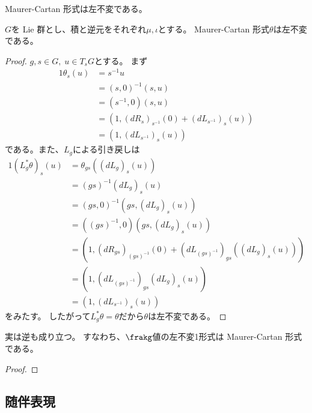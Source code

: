 \documentclass[report]{jlreq}
\begin{document}
Maurer-Cartan 形式は左不変である。

\begin{proposition}
    $G$を Lie 群とし、積と逆元をそれぞれ$\mu, \iota$とする。
    Maurer-Cartan 形式$\theta$は左不変である。
\end{proposition}

\begin{proof}
    $g, s \in G,\; u \in T_sG$とする。
    まず
    \begin{alignat}{1}
        \theta_s(u)
            &= s^{-1}u \\
            &= (s, 0)^{-1} (s, u) \\
            &= (s^{-1}, 0) (s, u) \\
            &= (1, (dR_s)_{s^{-1}}(0) + (dL_{s^{-1}})_s(u)) \\
            &= (1, (dL_{s^{-1}})_s(u))
    \end{alignat}
    である。また、$L_g$による引き戻しは
    \begin{alignat}{1}
        (L_g^* \theta)_s (u)
            &= \theta_{gs} ((dL_g)_s(u)) \\
            &= (gs)^{-1} (dL_g)_s(u) \\
            &= (gs, 0)^{-1} (gs, (dL_g)_s(u)) \\
            &= ((gs)^{-1}, 0) (gs, (dL_g)_s(u)) \\
            &= (1, (dR_{gs})_{(gs)^{-1}}(0) + (dL_{(gs)^{-1}})_{gs}((dL_g)_s(u))) \\
            &= (1, (dL_{(gs)^{-1}})_{gs}(dL_g)_s(u)) \\
            &= (1, (dL_{s^{-1}})_s(u))
    \end{alignat}
    をみたす。
    したがって$L_g^* \theta = \theta$だから$\theta$は左不変である。
\end{proof}

実は逆も成り立つ。
すなわち、$\frakg$値の左不変1形式は Maurer-Cartan 形式である。

\begin{proposition}
    \TODO{}
\end{proposition}

\begin{proof}
    \TODO{}
\end{proof}


\subsection{随伴表現}
\end{document}
